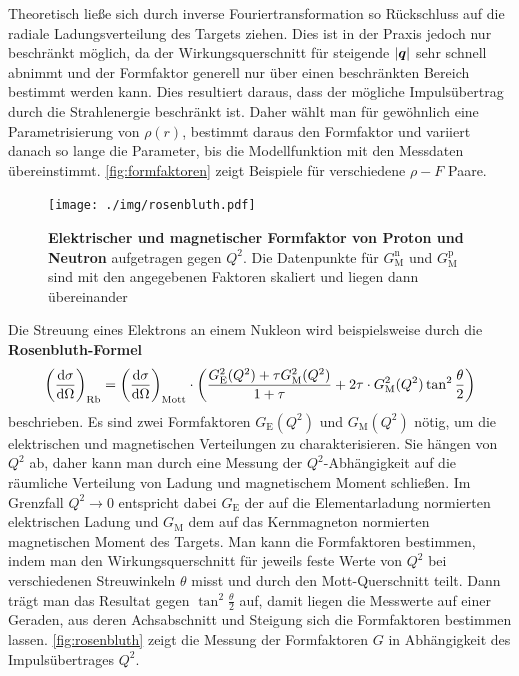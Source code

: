 Theoretisch ließe sich durch inverse Fouriertransformation so Rückschluss auf die radiale Ladungsverteilung des Targets ziehen.
Dies ist in der Praxis jedoch nur beschränkt möglich, da der Wirkungsquerschnitt für steigende $|\mvec{q}|$ sehr schnell abnimmt und der Formfaktor generell nur über einen beschränkten Bereich bestimmt werden kann.
Dies resultiert daraus, dass der mögliche Impulsübertrag durch die Strahlenergie beschränkt ist.
Daher wählt man für gewöhnlich eine Parametrisierung von $\rho(r)$, bestimmt daraus den Formfaktor und variiert danach so lange die Parameter, bis die Modellfunktion mit den Messdaten übereinstimmt.
\autoref{fig:formfaktoren} zeigt Beispiele für verschiedene $\rho-F$ Paare.

\begin{figure}
	\centering
	\texttt{[image: ./img/rosenbluth.pdf]}
	\caption[Elektrischer und magnetischer Formfaktor von Proton und Neutron]{\textbf{Elektrischer und magnetischer Formfaktor von Proton und Neutron} aufgetragen gegen $Q^2$. Die Datenpunkte für $G_\text{M}^\text{n}$ und $G_\text{M}^\text{p}$ sind mit den angegebenen Faktoren skaliert und liegen dann übereinander}
	\label{fig:rosenbluth}
\end{figure}
Die Streuung eines Elektrons an einem Nukleon wird beispielsweise durch die \textbf{Rosenbluth-Formel}
\begin{equation*}
	\left(\diff[\sigma]{\Omega}\right)_\text{Rb} = \left(\diff[\sigma]{\Omega}\right)_\text{Mott}\cdot\left(\frac{G_\text{E}^2(Q^2) + \tau G_\text{M}^2(Q^2)}{1+\tau} + 2\tau\cdot G_\text{M}^2(Q^2)\tan^2\frac{\theta}{2}\right)
\end{equation*}
beschrieben. Es sind zwei Formfaktoren $G_\text{E}(Q^2)$ und $G_\text{M}(Q^2)$ nötig, um die elektrischen und magnetischen Verteilungen zu charakterisieren.
Sie hängen von $Q^2$ ab, daher kann man durch eine Messung der $Q^2$-Abhängigkeit auf die räumliche Verteilung von Ladung und magnetischem Moment schließen.
Im Grenzfall $Q^2\rightarrow 0$ entspricht dabei $G_\text{E}$ der auf die Elementarladung normierten elektrischen Ladung und $G_\text{M}$ dem auf das Kernmagneton normierten magnetischen Moment des Targets.
Man kann die Formfaktoren bestimmen, indem man den Wirkungsquerschnitt für jeweils feste Werte von $Q^2$ bei verschiedenen Streuwinkeln $\theta$ misst und durch den Mott-Querschnitt teilt.
Dann trägt man das Resultat gegen $\tan^2\frac{\theta}{2}$ auf, damit liegen die Messwerte auf einer Geraden, aus deren Achsabschnitt und Steigung sich die Formfaktoren bestimmen lassen.
\autoref{fig:rosenbluth} zeigt die Messung der Formfaktoren $G$ in Abhängigkeit des Impulsübertrages $Q^2$.
